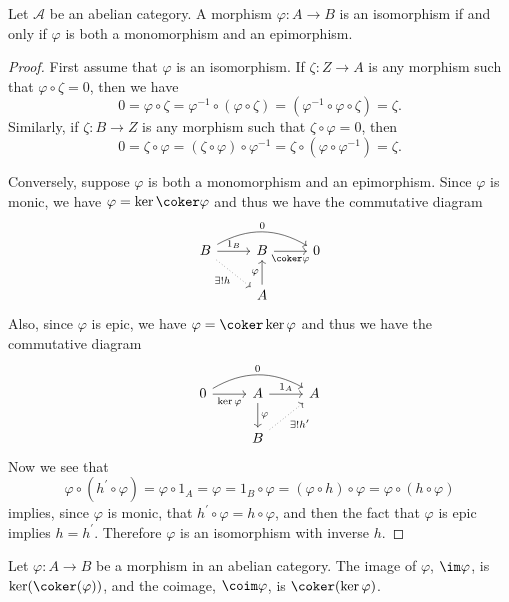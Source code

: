 \documentclass[10pt]{amsart}
\begin{document}
\begin{lem}\label{lem6}
  Let $\mathcal{A}$ be an abelian category.
  A morphism $\varphi : A \rightarrow B$ is an isomorphism if and only if $\varphi$ is both a monomorphism and an epimorphism.

  \begin{proof}
    First assume that $\varphi$ is an isomorphism.
    If $\zeta : Z \rightarrow A$ is any morphism such that $\varphi \circ \zeta = 0$, then we have
    $$0 = \varphi \circ \zeta = \varphi^{-1} \circ (\varphi \circ \zeta) = (\varphi^{-1} \circ \varphi \circ \zeta) = \zeta.$$
    Similarly, if $\zeta : B \rightarrow Z$ is any morphism such that $\zeta \circ \varphi = 0$, then
    $$0 = \zeta \circ \varphi = (\zeta \circ \varphi) \circ \varphi^{-1} = \zeta \circ (\varphi \circ \varphi^{-1}) = \zeta.$$

    Conversely, suppose $\varphi$ is both a monomorphism and an epimorphism.
    Since $\varphi$ is monic, we have $\varphi = \ker\coker\varphi$ and thus we have the commutative diagram
    $$\begin{tikzcd}
      B\arrow[dotted,swap]{rd}{\exists !h} \arrow[bend left]{rr}{0}\arrow{r}{1_B} & B\arrow[swap]{r}{\coker\varphi} & 0\\
      & A\arrow{u}{\varphi} &
    \end{tikzcd}$$
    Also, since $\varphi$ is epic, we have $\varphi = \coker\ker\varphi$ and thus we have the commutative diagram
    $$\begin{tikzcd}
      0 \arrow[bend left]{rr}{0}\arrow[swap]{r}{\ker\varphi} & A \arrow{r}{1_A} \arrow{d}{\varphi} & A\\
      & B\arrow[swap, dotted]{ur}{\exists ! h^\prime} &
    \end{tikzcd}$$
    Now we see that
    $$\varphi \circ (h^\prime \circ \varphi) = \varphi \circ 1_A = \varphi = 1_B \circ \varphi = (\varphi \circ h) \circ \varphi = \varphi \circ (h \circ \varphi)$$
    implies, since $\varphi$ is monic, that $h^\prime \circ \varphi = h \circ \varphi$, and then the fact that $\varphi$ is epic implies $h = h^\prime$.
    Therefore $\varphi$ is an isomorphism with inverse $h$.
  \end{proof}
\end{lem}

\begin{defn}
  Let $\varphi \colon A \rightarrow B$ be a morphism in an abelian category.
  The image of $\varphi$, $\im\varphi$, is $\ker(\coker(\varphi))$, and the coimage, $\coim\varphi$, is $\coker(\ker\varphi)$.
\end{defn}
\end{document}
